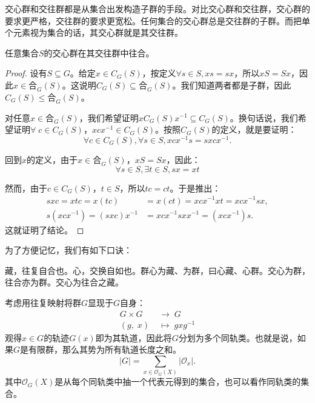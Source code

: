 \documentclass[12pt,UTF8,fontset=none]{ctexbook}
\begin{document}
交心群和交往群都是从集合出发构造子群的手段。对比交心群和交往群，交心群的要求更严格，交往群的要求更宽松。任何集合的交心群总是交往群的子群。而把单个元素视为集合的话，其交心群就是其交往群。

\begin{pp}
    任意集合$S$的交心群在其交往群中往合。
\end{pp}
\begin{proof}
    设有$S\subseteq G$。给定$x\in C_G(S)$，按定义$\forall s\in S, xs = sx$，所以$xS = Sx$，因此$x\in \text{合}_G(S)$。这说明$C_G(S)\subseteq \text{合}_G(S)$。我们知道两者都是子群，因此$C_G(S)\leq \text{合}_G(S)$。

    对任意$x\in \text{合}_G(S)$，我们希望证明$xC_G(S)x^{-1} \subseteq C_G(S)$。换句话说，我们希望证明$\forall\;c\in C_G(S)$，$xcx^{-1} \in C_G(S)$。按照$C_G(S)$的定义，就是要证明：
    $$ \forall c \in C_G(S), \forall s \in S, xcx^{-1}s = sxcx^{-1}. $$

    回到$x$的定义，由于$x\in \text{合}_G(S)$，$xS = Sx$，因此：
    $$\forall s\in S, \exists t \in S, sx = xt $$

    然而，由于$c\in C_G(S)$，$t\in S$，所以$tc = ct$。于是推出：
    \begin{align*}
        sxc = xtc = x(tc) &= x(ct) = xcx^{-1}xt = xcx^{-1}sx, \\
        s\left(xcx^{-1}\right) = (sxc)x^{-1} &= xcx^{-1}sxx^{-1} = \left(xcx^{-1}\right)s.
    \end{align*}
    这就证明了结论。
\end{proof}

为了方便记忆，我们有如下口诀：

\vspace{16pt}
{\Large 藏，往复自合也。心，交换自如也。群心为藏、为群，曰心藏、心群。交心为群，往合亦为群。交心为往合之藏。}

\vspace{16pt}

考虑用往复映射将群$G$显现于$G$自身：
\begin{align*}
    G \times G \; & \longrightarrow \; G \\
    (g, \;x) \; &\mapsto \; gxg^{-1}
\end{align*}
观得$x\in G$的轨迹$G(x)$即为其轨道，因此将$G$分划为多个同轨类。也就是说，如果$G$是有限群，那么其势为所有轨道长度之和。
$$
    |G| = \sum_{x\in \mathcal{O}_G(X)} |\mathcal{O}_x|.
$$
其中$\mathcal{O}_G(X)$是从每个同轨类中抽一个代表元得到的集合，也可以看作同轨类的集合。
\end{document}

